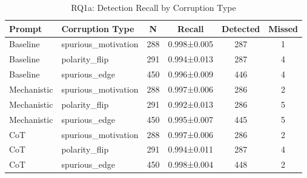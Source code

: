 \begin{table}[htbp]
\centreing
\caption{RQ1a: Detection Recall by Corruption Type}
\label{tab:rq1a_corruption_type}
\begin{tabular}{llcccc}
\toprule
\textbf{Prompt} & \textbf{Corruption Type} & \textbf{N} & \textbf{Recall} & \textbf{Detected} & \textbf{Missed} \\
\midrule
Baseline & spurious_motivation & 288 & 0.998±0.005 & 287 & 1 \\
Baseline & polarity_flip & 291 & 0.994±0.013 & 287 & 4 \\
Baseline & spurious_edge & 450 & 0.996±0.009 & 446 & 4 \\
Mechanistic & spurious_motivation & 288 & 0.997±0.006 & 286 & 2 \\
Mechanistic & polarity_flip & 291 & 0.992±0.013 & 286 & 5 \\
Mechanistic & spurious_edge & 450 & 0.995±0.007 & 445 & 5 \\
CoT & spurious_motivation & 288 & 0.997±0.006 & 286 & 2 \\
CoT & polarity_flip & 291 & 0.994±0.011 & 287 & 4 \\
CoT & spurious_edge & 450 & 0.998±0.004 & 448 & 2 \\
\bottomrule
\end{tabular}
\end{table}
